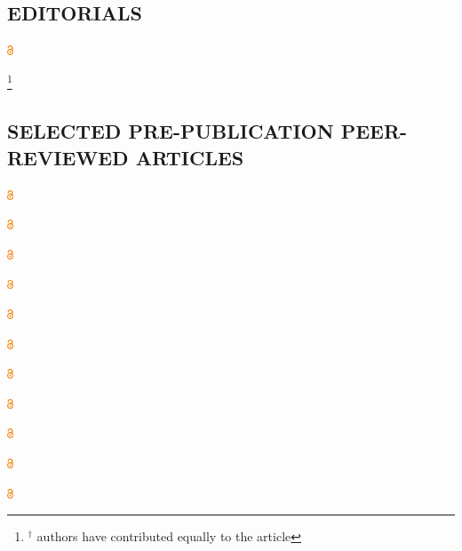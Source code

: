 \documentclass[11pt,letterpaper,resume,roman]{moderncv}
\newcommand{\open}[1]{{\color{orange}{[#1]}}}
\newcommand{\openaccess}{\includegraphics[width=0.5em]{pics/Open_Access_logo_PLoS_white.pdf}}
\newcommand{\openaccesshref}[1]{\href{#1}{\openaccess}}
\newcommand{\openaccessdoi}[1]{\openaccesshref{http://dx.doi.org/#1}}
\newcommand{\preprint}[1]{\href{http://dx.doi.org/#1}{\open{Preprint}}}
\begin{document}
\subsection{EDITORIALS}
\sloppy
\begin{bibenum}[ref=\arabic*,parsep=-0.4em]
\item {} \openaccessdoi{10.12688/f1000research.6229.1}  %
\end{bibenum}
\vspace{1em}

\let\thefootnote\relax\footnote{\hspace{-2em}\noindent$^\dagger$ authors have contributed equally to the article}

\subsection{SELECTED PRE-PUBLICATION PEER-REVIEWED ARTICLES}

\sloppy
\begin{bibenum}[ref=\arabic*,parsep=-0.4em]
\item {} \openaccessdoi{10.1093/cercor/bhx138} \preprint{10.1101/045252} %
\item {} \openaccessdoi{10.1038/nn.4550}  \preprint{10.1101/045104} %
\item {} \openaccessdoi{10.1523/JNEUROSCI.3395-15.2016}  %
\item {} \openaccessdoi{10.1038/sdata.2016.44} \preprint{10.1101/034561} %
\item {} \openaccessdoi{10.1093/cercor/bhw068}        %
\item {} \openaccessdoi{10.1016/j.neuron.2016.10.033}  %
\item {}   \openaccessdoi{10.1186/s13742-015-0072-7}    %
\item {}         %
\item {} \openaccessdoi{10.1016/j.concog.2013.05.002} %
\item {}         %
\item {} \openaccessdoi{10.1371/journal.pone.0066620} %
\item {}  \openaccessdoi{10.1523/JNEUROSCI.5547-11.2012} %
\item {} \openaccessdoi{10.3389/fninf.2012.00022} %
\end{bibenum}
\end{document}

